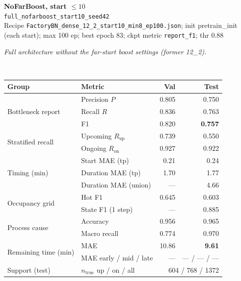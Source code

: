 \documentclass[9pt,a4paper,twocolumn]{extarticle}
\begin{document}
\noindent\begin{minipage}{\columnwidth}
\begin{center}
{\small\bfseries NoFarBoost, start $\le 10$}\\
{\scriptsize\texttt{full\_nofarboost\_start10\_seed42}}\\
{\scriptsize Recipe \texttt{FactoryBN\_dense\_12\_2\_start10\_min8\_ep100.json}; init pretrain\_init (each start); max 100 ep; best epoch 83; ckpt metric \texttt{report\_f1}; thr 0.88}\\[1pt]
\parbox{0.96\columnwidth}{\scriptsize\itshape Full architecture without the far-start boost settings (former 12\_2).}\\[2pt]
\scriptsize\setlength{\tabcolsep}{3pt}
\begin{tabular}{llrr}
\toprule
Group & Metric & Val & Test \\
\midrule
\multirow{3}{*}{Bottleneck report}
  & Precision $P$ & 0.805 & 0.750 \\
  & Recall $R$ & 0.836 & 0.763 \\
  & F1 & 0.820 & \textbf{0.757} \\
\midrule
\multirow{2}{*}{Stratified recall}
  & Upcoming $R_{\mathrm{up}}$ & 0.739 & 0.550 \\
  & Ongoing $R_{\mathrm{on}}$ & 0.927 & 0.922 \\
\midrule
\multirow{3}{*}{Timing (min)}
  & Start MAE (tp) & 0.21 & 0.24 \\
  & Duration MAE (tp) & 1.70 & 1.77 \\
  & Duration MAE (union) & --- & 4.66 \\
\midrule
\multirow{2}{*}{Occupancy grid}
  & Hot F1 & 0.645 & 0.603 \\
  & State F1 (1 step) & --- & 0.885 \\
\midrule
\multirow{2}{*}{Process cause}
  & Accuracy & 0.956 & 0.965 \\
  & Macro recall & 0.774 & 0.970 \\
\midrule
\multirow{2}{*}{Remaining time (min)}
  & MAE & 10.86 & \textbf{9.61} \\
  & MAE early / mid / late & --- & --- / --- / --- \\
\midrule
Support (test)
  & $n_{\mathrm{true}}$ up / on / all & \multicolumn{2}{r}{604 / 768 / 1372} \\
\bottomrule
\end{tabular}
\end{center}
\end{minipage}\par\vspace{6pt}
\end{document}
